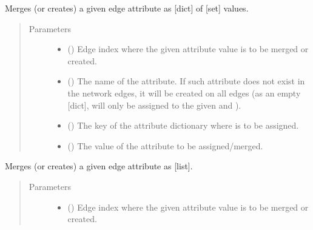 \documentclass[letterpaper,10pt,english]{sphinxmanual}
\begin{document}
\begin{fulllineitems}
\begin{fulllineitems}
\label{\detokenize{reference:pypath.main.PyPath.add_grouped_set_eattr}}
Merges (or creates) a given edge attribute as {[}dict{]} of {[}set{]}
values.
\begin{quote}\begin{description}
\item[{Parameters}] \leavevmode\begin{itemize}
\item {} 
 () \textendash{} Edge index where the given attribute value is to be merged
or created.

\item {} 
 () \textendash{} The name of the attribute. If such attribute does not exist
in the network edges, it will be created on all edges (as an
empty {[}dict{]},  will only be assigned to the given
 and ).

\item {} 
 () \textendash{} The key of the attribute dictionary where  is to be
assigned.

\item {} 
 () \textendash{} The value of the attribute to be assigned/merged.

\end{itemize}

\end{description}\end{quote}

\end{fulllineitems}


\begin{fulllineitems}
\label{\detokenize{reference:pypath.main.PyPath.add_list_eattr}}
Merges (or creates) a given edge attribute as {[}list{]}.
\begin{quote}\begin{description}
\item[{Parameters}] \leavevmode\begin{itemize}
\item {} 
 () \textendash{} Edge index where the given attribute value is to be merged
or created.


\end{itemize}
\end{description}
\end{quote}
\end{fulllineitems}
\end{fulllineitems}
\end{document}
